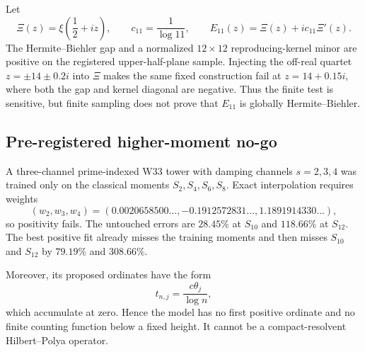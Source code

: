 Let
\[
 \Xi(z)=\xi\!\left(\frac12+iz\right),
 \qquad
 c_{11}=\frac1{\log11},
 \qquad
 E_{11}(z)=\Xi(z)+ic_{11}\Xi'(z).
\]
The Hermite--Biehler gap and a normalized $12\times12$ reproducing-kernel
minor are positive on the registered upper-half-plane sample. Injecting the
off-real quartet $z=\pm14\pm0.2i$ into $\Xi$ makes the same fixed construction
fail at $z=14+0.15i$, where both the gap and kernel diagonal are negative.
Thus the finite test is sensitive, but finite sampling does not prove that
$E_{11}$ is globally Hermite--Biehler.

\subsection{Pre-registered higher-moment no-go}

A three-channel prime-indexed W33 tower with damping channels $s=2,3,4$ was
trained only on the classical moments $S_2,S_4,S_6,S_8$. Exact interpolation
requires weights
\[
 (w_2,w_3,w_4)
 =(0.0020658500\ldots,-0.1912572831\ldots,1.1891914330\ldots),
\]
so positivity fails. The untouched errors are $28.45\%$ at $S_{10}$ and
$118.66\%$ at $S_{12}$. The best positive fit already misses the training
moments and then misses $S_{10}$ and $S_{12}$ by $79.19\%$ and $308.66\%$.

Moreover, its proposed ordinates have the form
\[
 t_{n,j}=\frac{c\theta_j}{\log n},
\]
which accumulate at zero. Hence the model has no first positive ordinate and
no finite counting function below a fixed height. It cannot be a
compact-resolvent Hilbert--Polya operator.
